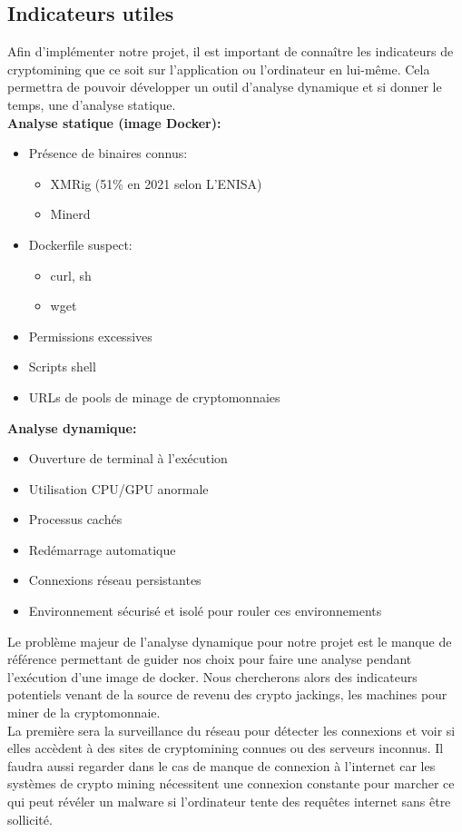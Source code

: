 \subsection{Indicateurs utiles}
Afin d'implémenter notre projet, il est important de connaître les indicateurs de cryptomining que ce soit sur l'application ou l'ordinateur en lui-même. Cela permettra de pouvoir développer un outil d'analyse dynamique et si donner le temps, une d'analyse statique. \\
\newline
\textbf{Analyse statique (image Docker):}
\begin{itemize}
    \item Présence de binaires connus:
    \begin{itemize}
        \item XMRig (51\% en 2021 selon L'ENISA) \cite{enisa2021threatlandscape} \cite{checkpoint2026xmrig} \cite{yevdokimova2022xmrig}
        \item Minerd \cite{checkpoint2026xmrig} \cite{cryptominerbros2025tools}
    \end{itemize}
    \item Dockerfile suspect:
    \begin{itemize}
        \item curl, sh
        \item wget
    \end{itemize}
    \item Permissions excessives
    \item Scripts shell
    \item URLs de pools de minage de cryptomonnaies
\end{itemize}
\textbf{Analyse dynamique:}
\begin{itemize}
    \item Ouverture de terminal à l'exécution
    \item Utilisation CPU/GPU anormale \cite{checkpoint2026xmrig}
    \item Processus cachés
    \item Redémarrage automatique
    \item Connexions réseau persistantes \cite{cryptominerbros2025tools}
    \item Environnement sécurisé et isolé pour rouler ces environnements
\end{itemize}
Le problème majeur de l'analyse dynamique pour notre projet est le manque de référence permettant de guider nos choix pour faire une analyse pendant l'exécution d'une image de docker. Nous chercherons alors des indicateurs potentiels venant de la source de revenu des crypto jackings, les machines pour miner de la cryptomonnaie. \\
\newline 
La première sera la surveillance du réseau pour détecter les connexions et voir si elles accèdent à des sites de cryptomining connues ou des serveurs inconnus. Il faudra aussi regarder dans le cas de manque de connexion à l'internet car les systèmes de crypto mining nécessitent une connexion constante pour marcher ce qui peut révéler un malware si l'ordinateur tente des requêtes internet sans être sollicité.
\newline

